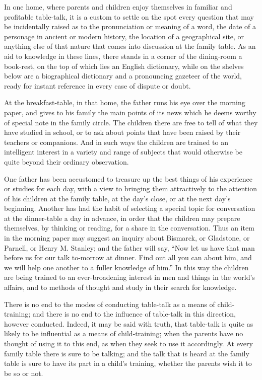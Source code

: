 \documentclass[
]{book}
\begin{document}
In one home, where parents and children enjoy themselves in familiar and profitable table-talk, it is a custom to settle on the spot every question that may be incidentally raised as to the pronunciation or meaning of a word, the date of a personage in ancient or modern history, the location of a geographical site, or anything else of that nature that comes into discussion at the family table. As an aid to knowledge in these lines, there stands in a corner of the dining-room a book-rest, on the top of which lies an English dictionary, while on the shelves below are a biographical dictionary and a pronouncing gazeteer of the world, ready for instant reference in every case of dispute or doubt.

At the breakfast-table, in that home, the father runs his eye over the morning paper, and gives to his family the main points of its news which he deems worthy of special note in the family circle. The children there are free to tell of what they have studied in school, or to ask about points that have been raised by their teachers or companions. And in such ways the children are trained to an intelligent interest in a variety and range of subjects that would otherwise be quite beyond their ordinary observation.

One father has been accustomed to treasure up the best things of his experience or studies for each day, with a view to bringing them attractively to the attention of his children at the family table, at the day's close, or at the next day's beginning. Another has had the habit of selecting a special topic for conversation at the dinner-table a day in advance, in order that the children may prepare themselves, by thinking or reading, for a share in the conversation. Thus an item in the morning paper may suggest an inquiry about Bismarck, or Gladstone, or Parnell, or Henry M. Stanley; and the father will say, ``Now let us have that man before us for our talk to-morrow at dinner. Find out all you can about him, and we will help one another to a fuller knowledge of him.'' In this way the children are being trained to an ever-broadening interest in men and things in the world's affairs, and to methods of thought and study in their search for knowledge.

There is no end to the modes of conducting table-talk as a means of child-training; and there is no end to the influence of table-talk in this direction, however conducted. Indeed, it may be said with truth, that table-talk is quite as likely to be influential as a means of child-training; when the parents have no thought of using it to this end, as when they seek to use it accordingly. At every family table there is sure to be talking; and the talk that is heard at the family table is sure to have its part in a child's training, whether the parents wish it to be so or not.
\end{document}
